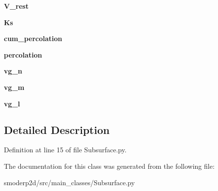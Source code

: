 \begin{DoxyCompactItemize}
\item 
\hypertarget{classsmoderp2d_1_1src_1_1main__classes_1_1Subsurface_1_1SubArrs_a691bef39cf51da5efdb94fea1f2272a1}{{\bfseries V\-\_\-rest}}\label{classsmoderp2d_1_1src_1_1main__classes_1_1Subsurface_1_1SubArrs_a691bef39cf51da5efdb94fea1f2272a1}

\item 
\hypertarget{classsmoderp2d_1_1src_1_1main__classes_1_1Subsurface_1_1SubArrs_a28d30e4ccd34097521288936adc91529}{{\bfseries Ks}}\label{classsmoderp2d_1_1src_1_1main__classes_1_1Subsurface_1_1SubArrs_a28d30e4ccd34097521288936adc91529}

\item 
\hypertarget{classsmoderp2d_1_1src_1_1main__classes_1_1Subsurface_1_1SubArrs_a87b6c5d67b9fac775260fd7a844fc9b3}{{\bfseries cum\-\_\-percolation}}\label{classsmoderp2d_1_1src_1_1main__classes_1_1Subsurface_1_1SubArrs_a87b6c5d67b9fac775260fd7a844fc9b3}

\item 
\hypertarget{classsmoderp2d_1_1src_1_1main__classes_1_1Subsurface_1_1SubArrs_a65c22873728ec0970ca12b93693eaa03}{{\bfseries percolation}}\label{classsmoderp2d_1_1src_1_1main__classes_1_1Subsurface_1_1SubArrs_a65c22873728ec0970ca12b93693eaa03}

\item 
\hypertarget{classsmoderp2d_1_1src_1_1main__classes_1_1Subsurface_1_1SubArrs_a20b6c1f5d889d73c51edb0478822eeca}{{\bfseries vg\-\_\-n}}\label{classsmoderp2d_1_1src_1_1main__classes_1_1Subsurface_1_1SubArrs_a20b6c1f5d889d73c51edb0478822eeca}

\item 
\hypertarget{classsmoderp2d_1_1src_1_1main__classes_1_1Subsurface_1_1SubArrs_afa2076afdd18d58dc43a0172345d2c15}{{\bfseries vg\-\_\-m}}\label{classsmoderp2d_1_1src_1_1main__classes_1_1Subsurface_1_1SubArrs_afa2076afdd18d58dc43a0172345d2c15}

\item 
\hypertarget{classsmoderp2d_1_1src_1_1main__classes_1_1Subsurface_1_1SubArrs_adb7cbc36ecc6a600feaad990a1769645}{{\bfseries vg\-\_\-l}}\label{classsmoderp2d_1_1src_1_1main__classes_1_1Subsurface_1_1SubArrs_adb7cbc36ecc6a600feaad990a1769645}

\end{DoxyCompactItemize}


\subsection{Detailed Description}


Definition at line 15 of file Subsurface.\-py.



The documentation for this class was generated from the following file\-:\begin{DoxyCompactItemize}
\item 
smoderp2d/src/main\-\_\-classes/Subsurface.\-py\end{DoxyCompactItemize}
